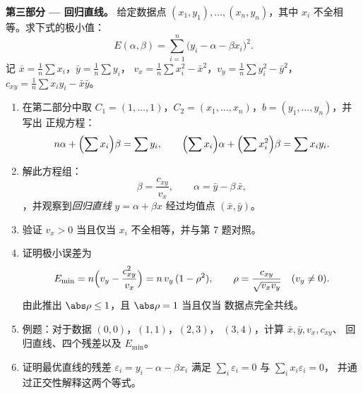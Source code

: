 \begin{problem}
\medskip
\noindent\textbf{第三部分 --- 回归直线。} 给定数据点
$(x_1, y_1), \dots, (x_n, y_n)$，其中 $x_i$ 不全相等。求下式的极小值：
\[
E(\alpha, \beta) = \sum_{i=1}^{n}\bigl(y_i - \alpha - \beta
x_i\bigr)^2 .
\]
记 $\bar x = \frac1n\sum x_i$，$\bar y = \frac1n\sum y_i$，
$v_x = \frac1n\sum x_i^2 - \bar x^2$，$v_y = \frac1n\sum y_i^2 -
\bar y^2$，$c_{xy} = \frac1n\sum x_i y_i - \bar x\bar y$。
\begin{enumerate}[resume]
  \item 在第二部分中取 $C_1 = (1, \dots, 1)$，$C_2 =
        (x_1, \dots, x_n)$，$b = (y_1, \dots, y_n)$，并写出
        正规方程：
        \[
        n\alpha + \Bigl(\sum x_i\Bigr)\beta = \sum y_i,
        \qquad
        \Bigl(\sum x_i\Bigr)\alpha + \Bigl(\sum
        x_i^2\Bigr)\beta = \sum x_i y_i .
        \]
  \item 解此方程组：
        \[
        \beta = \frac{c_{xy}}{v_x},
        \qquad
        \alpha = \bar y - \beta\,\bar x ,
        \]
        ，并观察到\emph{回归直线} $y = \alpha
        + \beta x$ 经过均值点 $(\bar x, \bar
        y)$。
  \item 验证 $v_x > 0$ 当且仅当 $x_i$
        不全相等，并与第 7 题对照。
  \item 证明极小误差为
        \[
        E_{\min} = n\Bigl(v_y - \frac{c_{xy}^2}{v_x}\Bigr)
        = n\,v_y\,(1 - \rho^2),
        \qquad
        \rho = \frac{c_{xy}}{\sqrt{v_x v_y}}
        \quad (v_y \neq 0).
        \]
        由此推出 $\abs\rho \leq 1$，且 $\abs\rho = 1$ 当且仅当
        数据点完全共线。
  \item 例题：对于数据 $(0,0)$，$(1,1)$，$(2,3)$，
        $(3,4)$，计算 $\bar x, \bar y, v_x, c_{xy}$、
        回归直线、四个残差以及 $E_{\min}$。
  \item 证明最优直线的残差 $\varepsilon_i = y_i - \alpha -
        \beta x_i$ 满足 $\sum_i
        \varepsilon_i = 0$ 与 $\sum_i x_i\varepsilon_i = 0$，
        并通过正交性解释这两个等式。
\end{enumerate}


\end{problem}
